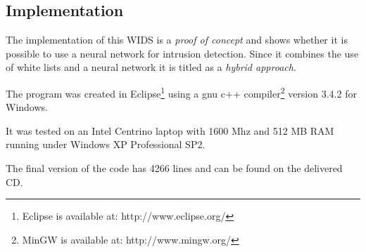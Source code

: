 \begin{appendix}
\chapter{Implementation}
\label{sec:implementation}

The implementation of this WIDS is a {\em proof of concept} and shows whether it is possible to use a neural network for intrusion detection. Since it combines the use of white lists and a neural network it is titled as a {\em hybrid approach}.

The program was created in Eclipse\footnote{Eclipse is available at: http://www.eclipse.org/} using a gnu c++ compiler\footnote{MinGW is available at: http://www.mingw.org/} version 3.4.2 for Windows.

It was tested on an Intel Centrino laptop with 1600 Mhz and 512 MB RAM running under Windows XP Professional SP2.

The final version of the code has 4266 lines and can be found on the delivered CD.


\end{appendix}
